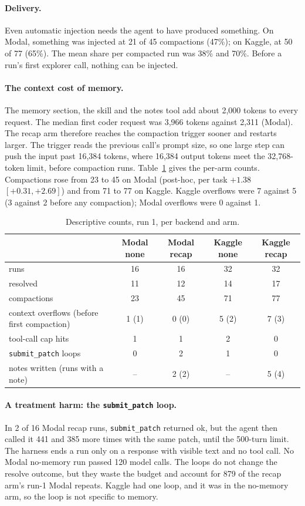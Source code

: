 \documentclass[11pt]{article}
\newcommand{\code}[1]{\texttt{#1}}
\begin{document}
\paragraph{Delivery.} Even automatic injection needs the agent to have produced something. On Modal,
something was injected at 21 of 45 compactions (47\%); on Kaggle, at 50 of 77 (65\%). The mean share
per compacted run was 38\% and 70\%. Before a run's first explorer call, nothing can be injected.

\paragraph{The context cost of memory.} The memory section, the skill and the notes tool add about
2,000 tokens to every request. The median first coder request was 3,966 tokens against 2,311
(Modal). The recap arm therefore reaches the compaction trigger sooner and restarts larger. The
trigger reads the previous call's prompt size, so one large step can push the input past 16,384
tokens, where 16,384 output tokens meet the 32,768-token limit, before compaction runs.
Table~\ref{tab:desc} gives the per-arm counts. Compactions rose from 23 to 45 on Modal (post-hoc,
per task $+1.38$ $[+0.31, +2.69]$) and from 71 to 77 on Kaggle. Kaggle overflows were 7 against 5
(3 against 2 before any compaction); Modal overflows were 0 against 1.

\begin{table}[t]\centering\small
\caption{Descriptive counts, run 1, per backend and arm.}\label{tab:desc}
\begin{tabular}{lcccc}\toprule
 & Modal none & Modal recap & Kaggle none & Kaggle recap \\\midrule
runs & 16 & 16 & 32 & 32 \\
resolved & 11 & 12 & 14 & 17 \\
compactions & 23 & 45 & 71 & 77 \\
context overflows (before first compaction) & 1 (1) & 0 (0) & 5 (2) & 7 (3) \\
tool-call cap hits & 1 & 1 & 2 & 0 \\
\code{submit\_patch} loops & 0 & 2 & 1 & 0 \\
notes written (runs with a note) & -- & 2 (2) & -- & 5 (4) \\\bottomrule
\end{tabular}
\end{table}

\paragraph{A treatment harm: the \code{submit\_patch} loop.} In 2 of 16 Modal recap runs,
\code{submit\_patch} returned ok, but the agent then called it 441 and 385 more times with the same
patch, until the 500-turn limit. The harness ends a run only on a response with visible text and no
tool call. No Modal no-memory run passed 120 model calls. The loops do not change the resolve
outcome, but they waste the budget and account for 879 of the recap arm's run-1 Modal repeats.
Kaggle had one loop, and it was in the no-memory arm, so the loop is not specific to memory.
\end{document}
